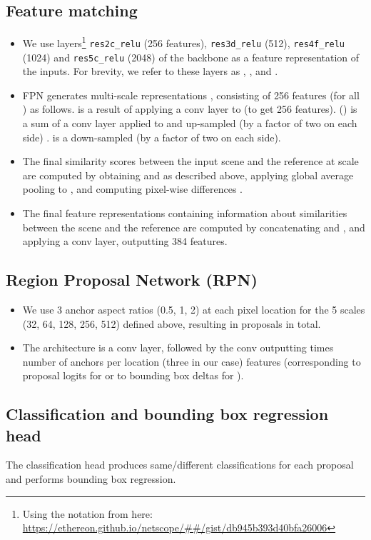 \documentclass{article}
\begin{document}
\subsection{Feature matching}
\begin{itemize}[nosep]
    \item We use layers\footnote{Using the notation from here: \url{https://ethereon.github.io/netscope/##/gist/db945b393d40bfa26006}} \texttt{res2c\_relu} (256 features), \texttt{res3d\_relu} (512), \texttt{res4f\_relu} (1024) and \texttt{res5c\_relu} (2048) of the backbone as a feature representation of the inputs. For brevity, we refer to these layers as , ,  and .
    \item FPN generates multi-scale representations ,  consisting of 256 features (for all ) as follows.  is a result of applying a  conv layer to  (to get 256 features).  () is a sum of a  conv layer applied to  and up-sampled (by a factor of two on each side) .  is a down-sampled  (by a factor of two on each side).
    \item The final similarity scores between the input scene and the reference at scale  are computed by obtaining  and  as described above, applying global average pooling to , and computing pixel-wise differences . 
    \item The final feature representations containing information about similarities between the scene and the reference are computed by concatenating  and , and applying a  conv layer, outputting 384 features.
\end{itemize}

\subsection{Region Proposal Network (RPN)}
\begin{itemize}[nosep]
    \item We use 3 anchor aspect ratios (0.5, 1, 2) at each pixel location for the 5 scales (32, 64, 128, 256, 512)  defined above, resulting in  proposals in total.
    \item The architecture is a  conv layer, followed by the  conv outputting  times number of anchors per location (three in our case) features (corresponding to proposal logits for  or to bounding box deltas for ).
\end{itemize}

\subsection{Classification and bounding box regression head}
The classification head produces same/different classifications for each proposal and performs bounding box regression.
\end{document}

